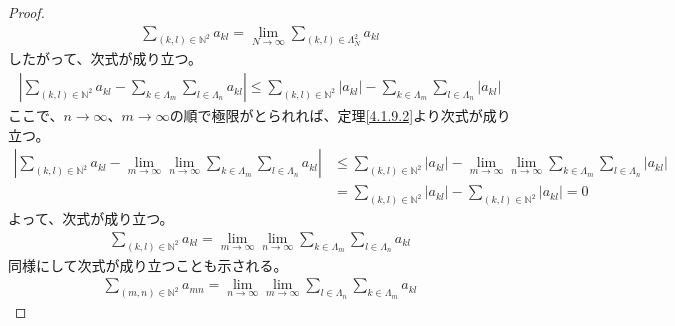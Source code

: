 \documentclass[dvipdfmx]{jsarticle}
\begin{document}
\begin{proof}
\begin{align*}
\sum_{(k,l) \in \mathbb{N}^{2}}a_{kl} = \lim_{N \rightarrow \infty}{\sum_{(k,l) \in \varLambda_{N}^{2}}a_{kl}}
\end{align*}
したがって、次式が成り立つ。
\begin{align*}
\left| \sum_{(k,l) \in \mathbb{N}^{2}}a_{kl} - \sum_{k \in \varLambda_{m}}{\sum_{l \in \varLambda_{n}}a_{kl}} \right| \leq \sum_{(k,l) \in \mathbb{N}^{2}}\left| a_{kl} \right| - \sum_{k \in \varLambda_{m}}{\sum_{l \in \varLambda_{n}}\left| a_{kl} \right|}
\end{align*}
ここで、$n \rightarrow \infty$、$m \rightarrow \infty$の順で極限がとられれば、定理\ref{4.1.9.2}より次式が成り立つ。
\begin{align*}
\left| \sum_{(k,l) \in \mathbb{N}^{2}}a_{kl} - \lim_{m \rightarrow \infty}{\lim_{n \rightarrow \infty}{\sum_{k \in \varLambda_{m}}{\sum_{l \in \varLambda_{n}}a_{kl}}}} \right| &\leq \sum_{(k,l) \in \mathbb{N}^{2}}\left| a_{kl} \right| - \lim_{m \rightarrow \infty}{\lim_{n \rightarrow \infty}{\sum_{k \in \varLambda_{m}}{\sum_{l \in \varLambda_{n}}\left| a_{kl} \right|}}}\\
&= \sum_{(k,l) \in \mathbb{N}^{2}}\left| a_{kl} \right| - \sum_{(k,l) \in \mathbb{N}^{2}}\left| a_{kl} \right| = 0
\end{align*}
よって、次式が成り立つ。
\begin{align*}
\sum_{(k,l) \in \mathbb{N}^{2}}a_{kl} = \lim_{m \rightarrow \infty}{\lim_{n \rightarrow \infty}{\sum_{k \in \varLambda_{m}}{\sum_{l \in \varLambda_{n}}a_{kl}}}}
\end{align*}
同様にして次式が成り立つことも示される。
\begin{align*}
\sum_{(m,n) \in \mathbb{N}^{2}}a_{mn} = \lim_{n \rightarrow \infty}{\lim_{m \rightarrow \infty}{\sum_{l \in \varLambda_{n}}{\sum_{k \in \varLambda_{m}}a_{kl}}}}
\end{align*}
\end{proof}
\end{document}
